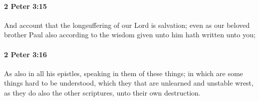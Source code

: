 		\paragraph{2 Peter 3:15} %
			\label{2PETER-3-15}

			And account that the longsuffering of our Lord is salvation; even as our beloved brother Paul also according to the wisdom given unto him hath written unto you;

			\begin{framed}
			\scriptsize
				\begin{compactdesc}
					\item[SBLG] 
				\end{compactdesc}
			\end{framed}

		\paragraph{2 Peter 3:16} %
			\label{2PETER-3-16}

			As also in all his epistles, speaking in them of these things; in which are some things hard to be understood, which they that are unlearned and unstable wrest, as they do also the other scriptures, unto their own destruction.

